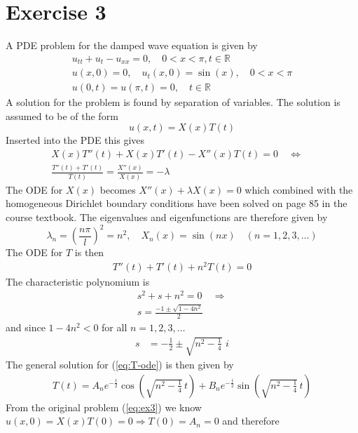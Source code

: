 \documentclass[11pt]{article}
\newcommand\myimp{\quad\Leftrightarrow\quad}
\newcommand\myreal{\mathbb{R}}
\begin{document}
\section*{Exercise 3}
A PDE problem for the damped wave equation is given by
\begin{gather}
    u_{tt} + u_t - u_{xx} = 0, \quad 0<x<\pi, t\in\myreal \nonumber\\
    u(x, 0)=0, \quad u_t(x, 0)=\sin(x), \quad 0<x<\pi \label{eq:ex3}\\
    u(0,t)=u(\pi, t)=0,\quad t\in\myreal \nonumber
\end{gather}
A solution for the problem is found by separation of variables. The solution is assumed to be of the form
\begin{equation*}
    u(x,t) = X(x)T(t)
\end{equation*}
Inserted into the PDE this gives
\begin{gather*}
    X(x)T''(t) + X(x)T'(t) - X''(x)T(t) = 0 \myimp \\
    \frac{T''(t) + T'(t)}{T(t)} = \frac{X''(x)}{X(x)} = - \lambda
\end{gather*}
The ODE for $X(x)$ becomes $X''(x) + \lambda X(x) = 0$ which combined with the homogeneous Dirichlet boundary conditions have been solved on page 85 in the course textbook. The eigenvalues and eigenfunctions are therefore given by
\begin{equation*}
    \lambda_n = \left(\frac{n\pi}{l}\right)^2 = n^2, \quad X_n(x) = \sin(nx) \quad (n=1,2,3,\dots)
\end{equation*}
The ODE for $T$ is then
\begin{gather}\label{eq:T-ode}
    T''(t) + T'(t) + n^2T(t) = 0
\end{gather}
The characteristic polynomium is
\begin{gather*}
    s^2 + s + n^2 = 0 \quad\Rightarrow \\
    s = \frac{-1\pm \sqrt{1 - 4n^2}}{2}
\end{gather*}
and since $1-4n^2<0$ for all $n=1,2,3,\dots$
\begin{align*}
    s &= -\frac{1}{2}\pm\sqrt{n^2-\frac{1}{4}}\,\,i
\end{align*}
The general solution for (\ref{eq:T-ode}) is then given by
\begin{align*}
    T(t) = A_n e^{-\frac{t}{2}} \cos\left(\sqrt{n^2-\frac{1}{4}}\,t\right) + B_n e^{-\frac{t}{2}} \sin\left(\sqrt{n^2-\frac{1}{4}}\,t\right)
\end{align*}
From the original problem (\ref{eq:ex3}) we know $u(x,0)=X(x)T(0)=0 \Rightarrow T(0)=A_n=0$ and therefore
\end{document}
